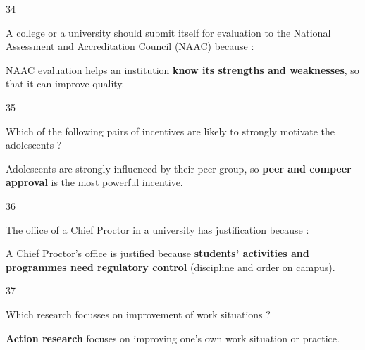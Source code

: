 \begin{question}{34}
{A college or a university should submit itself for evaluation to the National Assessment and Accreditation Council (NAAC) because :\par}
\begin{explain}
NAAC evaluation helps an institution \textbf{know its strengths and weaknesses}, so that it can improve quality.
\end{explain}
\end{question}

\begin{question}{35}
{Which of the following pairs of incentives are likely to strongly motivate the adolescents ?\par}
\begin{explain}
Adolescents are strongly influenced by their peer group, so \textbf{peer and compeer approval} is the most powerful incentive.
\end{explain}
\end{question}

\begin{question}{36}
{The office of a Chief Proctor in a university has justification because :\par}
\begin{explain}
A Chief Proctor's office is justified because \textbf{students' activities and programmes need regulatory control} (discipline and order on campus).
\end{explain}
\end{question}

\begin{question}{37}
{Which research focusses on improvement of work situations ?\par}
\begin{explain}
\textbf{Action research} focuses on improving one's own work situation or practice.
\end{explain}
\end{question}

